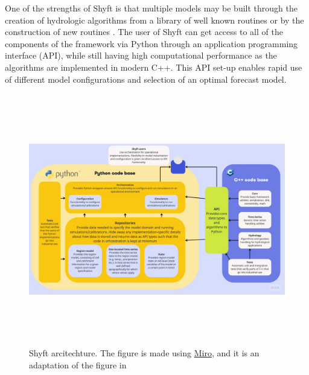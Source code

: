 One of the strengths of Shyft is that multiple models may be built through the creation of hydrologic algorithms from a library of well known routines or by the construction of new routines \autocite{burkhartShyftV4Framework2021}. The user of Shyft can get access to all of the components of the framework via Python through an application programming interface (API), while still having high computational performance as the algorithms are implemented in modern C++. This API set-up enables rapid use of different model configurations and selection of an optimal forecast model.

\begin{figure}[ht]
    \centering
    \includegraphics[width=1.1\textwidth,height=11cm]{figures/methods/Shyft Architecture.jpg}
    \caption{Shyft arcitechture. The figure is made using \href{https://miro.com}{Miro}, and it is an adaptation of the figure in \autocite{burkhartShyftV4Framework2021}}
    \label{fig:shyft_architecture}
\end{figure}


